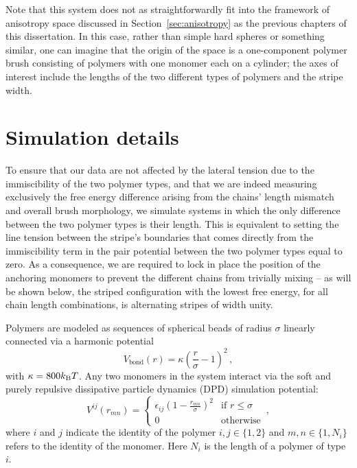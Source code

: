 Note that this system does not as straightforwardly fit into the framework of anisotropy space discussed in Section~\ref{sec:anisotropy} as the previous chapters of this dissertation.
In this case, rather than simple hard spheres or something similar, one can imagine that the origin of the space is a one-component polymer brush consisting of polymers with one monomer each on a cylinder; the axes of interest include the lengths of the two different types of polymers and the stripe width.
   
\section{Simulation details}

To ensure that our data are not  affected by the lateral tension due to the 
immiscibility of  the two polymer types, and that we are indeed measuring exclusively 
the free energy difference arising from the chains' length mismatch and overall brush morphology, 
we simulate systems in which the only difference between the two polymer types is their length. 
This is equivalent to setting the  line tension between 
the stripe's boundaries that comes directly from the immiscibility term in the pair 
potential between the two polymer types equal to zero.
As a consequence, we are required to lock in place the position of the anchoring monomers to prevent the different chains from trivially mixing -- as will be shown below, the striped configuration with the lowest free energy, for all chain length combinations, is alternating stripes of width unity.
 
Polymers are modeled as  sequences of spherical beads of radius $\sigma$ linearly connected via a harmonic potential 
\begin{equation}
	V_{\textrm{bond}}(r) = \kappa \left(\frac{r}{\sigma}-1\right)^2 \,,
\end{equation}
with $\kappa = 800 k_{\rm B}T$.
Any two monomers in the system interact 
via the soft and purely repulsive dissipative particle dynamics (DPD) simulation potential:
\begin{equation}
V^{ij}(r_{mn}) = 
	\begin{cases}
		\epsilon_{ij} \left(1-\frac{r_{mn}}{\sigma}\right)^2 & \textrm{if $r \leq \sigma$} \\
		0 & \textrm{otherwise}
	\end{cases} \,, \label{Vij}
\end{equation}
where $i$ and $j$ indicate the identity of the polymer $i,j \in\{1,2\}$ and $m,n \in\{1,N_i\}$ refers to the identity of the monomer. 
Here $N_i$ is the length of a polymer of type $i$. 

